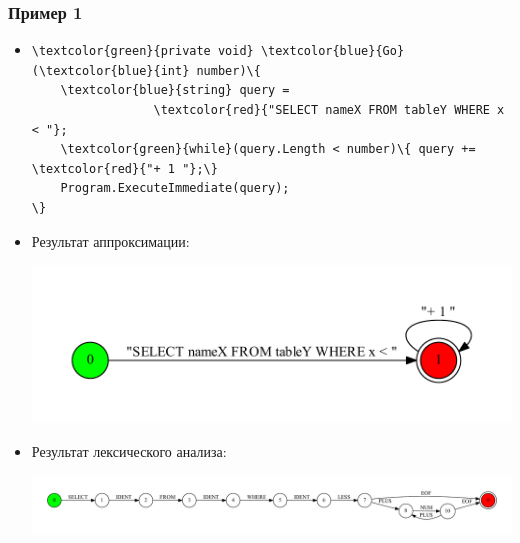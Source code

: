 \documentclass{beamer}
\begin{document}
\begin{frame}[fragile]
\transwipe[direction=90]
\frametitle{Пример 1}
\begin{itemize}
\item \begin{Verbatim}[commandchars=\\\{\}]
\textcolor{green}{private void} \textcolor{blue}{Go} (\textcolor{blue}{int} number)\{
	\textcolor{blue}{string} query =
		         \textcolor{red}{"SELECT nameX FROM tableY WHERE x < "};
	\textcolor{green}{while}(query.Length < number)\{ query += \textcolor{red}{"+ 1 "};\} 
	Program.ExecuteImmediate(query);
\}
\end{Verbatim}

\item Результат аппроксимации: 
\begin{center}
   \includegraphics[width=.6\linewidth]{while_appr}
\end{center}
\item Результат лексического анализа: \\
\begin{center}
   \includegraphics[width=1.0\linewidth]{WhileEx}
\end{center}
\end{itemize}
\end{frame}
\end{document}
